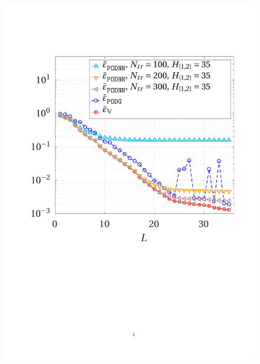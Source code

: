 \documentclass[12pt, a4paper, twoside, openright]{report}
\numberwithin{equation}{chapter}
\theoremstyle{theorem}
\theoremstyle{definition}
\theoremstyle{remark}
\theoremstyle{proposition}
\numberwithin{figure}{chapter}
\begin{document}
		\begin{figure}[H]
			\center
			\includegraphics[scale = 0.43, trim = {1.5cm 9cm 1.5cm 3.5cm}, clip]{poisson2d_2_error_vs_rank}

\end{figure}
\end{document}
